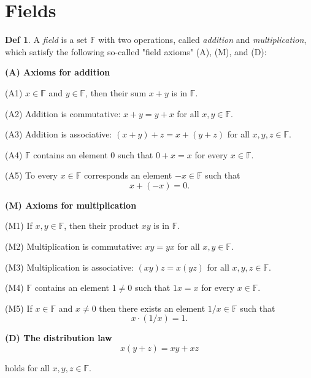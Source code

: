 \documentclass{article}
\theoremstyle{definition}
\newtheorem{definition}{Def}
\begin{document}
\section{Fields}
\begin{definition}
    A \textit{field} is a set $\mathbb{F}$ with two operations, called \textit{addition} and \textit{multiplication}, which satisfy the following so-called "field axioms" (A), (M), and (D):\par
    \textbf{(A) Axioms for addition}\par
    \hspace*{2em}(A1) $x \in \mathbb{F}$ and $y \in \mathbb{F}$, then their sum $x+y$ is in $\mathbb{F}$.\par
    \hspace*{2em}(A2) Addition is commutative: $x+y=y+x$ for all $x, y \in \mathbb{F}$. \par
    \hspace*{2em}(A3) Addition is associative: $(x+y)+z=x+(y+z)$ for all $x, y, z \in \mathbb{F}$.\par
    \hspace*{2em}(A4) $\mathbb{F}$ contains an element $0$ such that $0+x=x$ for every $x \in \mathbb{F}$.\par
    \hspace*{2em}(A5) To every $x \in \mathbb{F}$ corresponds an element $-x \in \mathbb{F}$ such that 
    \[
    x+(-x)=0.
    \]\par
    \textbf{(M) Axioms for multiplication}\par
    \hspace*{2em}(M1) If $x,y \in \mathbb{F}$, then their product $xy$ is in $\mathbb{F}$.\par
    \hspace*{2em}(M2) Multiplication is commutative: $xy=yx$ for all $x, y \in \mathbb{F}$.\par
    \hspace*{2em}(M3) Multiplication is associative: $(xy)z=x(yz)$ for all $x, y, z \in \mathbb{F}$.\par
    \hspace*{2em}(M4) $\mathbb{F}$ contains an element $1\neq0$ such that $1x=x$ for every $x \in \mathbb{F}$.\par
    \hspace*{2em}(M5) If $x \in \mathbb{F}$ and $x \neq 0$ then there exists an element $1/x \in \mathbb{F}$ such that 
    \[
    x \cdot (1/x)=1.
    \]\par
    \textbf{(D) The distribution law}
    \[
    x(y+z)=xy+xz
    \]\par
    \hspace*{2em}holds for all $x, y, z\in \mathbb{F}$.
\end{definition}
\end{document}
